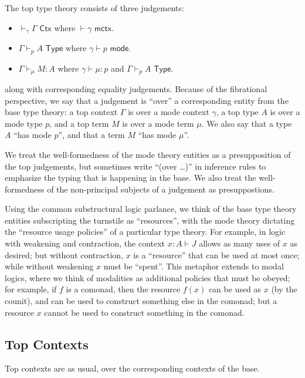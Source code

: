 \documentclass[10pt]{article}
\theoremstyle{definition}
\newcommand{\yields}{\vdash}
\newcommand{\CTX}{\,\,\mathsf{Ctx}}
\newcommand{\ctx}{\,\,\mathsf{mctx}}
\newcommand{\TYPE}{\,\,\mathsf{Type}}
\newcommand{\type}{\,\,\mathsf{mode}}
\begin{document}
The top type theory consists of three judgements: 
\begin{itemize}
\item $\yields_\gamma \Gamma \CTX$ where $\yields \gamma \ctx$.
\item $\Gamma \yields_p A \TYPE$ where $\gamma \yields p \type$.
\item $\Gamma \yields_\mu M : A$ where $\gamma \yields \mu : p$ and
  $\Gamma \yields_p A \TYPE$.
\end{itemize}
along with corresponding equality judgements.  Because of the
fibrational perspective, we say that a judgement is ``over'' a
corresponding entity from the base type theory: a top context $\Gamma$
is over a mode context $\gamma$, a top type $A$ is over a mode type $p$,
and a top term $M$ is over a mode term $\mu$.  We also say that a type $A$
``has mode $p$'', and that a term $M$ ``has mode $\mu$''. 

We treat the well-formedness of the mode theory entities as a
presupposition of the top judgements, but sometimes write ``(over
\ldots)'' in inference rules to emphasize the typing that is happening
in the base.  We also treat the well-formedness of the non-principal
subjects of a judgement as presuppostions.

Using the common substructural logic parlance, we think of the base type
theory entities subscripting the turnstile as ``resources'', with the
mode theory dictating the ``resource usage policies'' of a particular
type theory.  For example, in logic with weakening and contraction, the
context $x : A \vdash J$ allows as many uses of $x$ as desired; but
without contraction, $x$ is a ``resource'' that can be used at most
once; while without weakening $x$ must be ``spent''.  This metaphor
extends to modal logics, where we think of modalities as additional
policies that must be obeyed; for example, if $f$ is a comonad, then the
resource $f(x)$ can be used as $x$ (by the counit), and can be used to
construct something else in the comonad; but a resource $x$ cannot be
used to construct something in the comonad.

\subsection{Top Contexts}

Top contexts are as usual, over the corresponding contexts of the base.  

\end{document}
